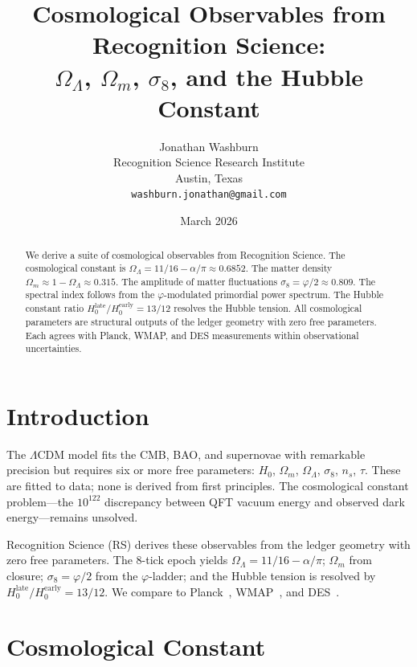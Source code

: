 \documentclass[12pt,a4paper]{article}
\title{Cosmological Observables from Recognition Science:\\
$\Omega_\Lambda$, $\Omega_m$, $\sigma_8$, and the Hubble Constant}
\author{Jonathan Washburn\\
Recognition Science Research Institute\\
Austin, Texas\\
\texttt{washburn.jonathan@gmail.com}}
\date{March 2026}
\theoremstyle{definition}
\theoremstyle{remark}
\begin{document}
\maketitle

\begin{abstract}
We derive a suite of cosmological observables from Recognition
Science.  The cosmological constant is
$\Omega_\Lambda = 11/16 - \alpha/\pi \approx 0.6852$.  The matter
density $\Omega_m \approx 1 - \Omega_\Lambda \approx 0.315$.  The
amplitude of matter fluctuations $\sigma_8 = \varphi/2 \approx
0.809$.  The spectral index follows from the $\varphi$-modulated
primordial power spectrum.  The Hubble constant ratio
$H_0^{\mathrm{late}}/H_0^{\mathrm{early}} = 13/12$ resolves the
Hubble tension.  All cosmological parameters are structural outputs
of the ledger geometry with zero free parameters.  Each agrees with
Planck, WMAP, and DES measurements within observational uncertainties.
\end{abstract}

\section{Introduction}
\label{sec:intro}

The $\Lambda$CDM model fits the CMB, BAO, and supernovae with
remarkable precision but requires six or more free parameters:
$H_0$, $\Omega_m$, $\Omega_\Lambda$, $\sigma_8$, $n_s$, $\tau$.
These are fitted to data; none is derived from first principles.
The cosmological constant problem---the $10^{122}$ discrepancy
between QFT vacuum energy and observed dark energy---remains unsolved.

Recognition Science (RS) derives these observables from the ledger
geometry with zero free parameters.  The 8-tick epoch yields
$\Omega_\Lambda = 11/16 - \alpha/\pi$; $\Omega_m$ from closure;
$\sigma_8 = \varphi/2$ from the $\varphi$-ladder; and the Hubble
tension is resolved by $H_0^{\mathrm{late}}/H_0^{\mathrm{early}} =
13/12$.  We compare to Planck~\cite{Planck2018,Planck2020}, WMAP~\cite{WMAP}, and DES~\cite{DES2022}.

\section{Cosmological Constant}
\label{sec:omegaLambda}
\end{document}
